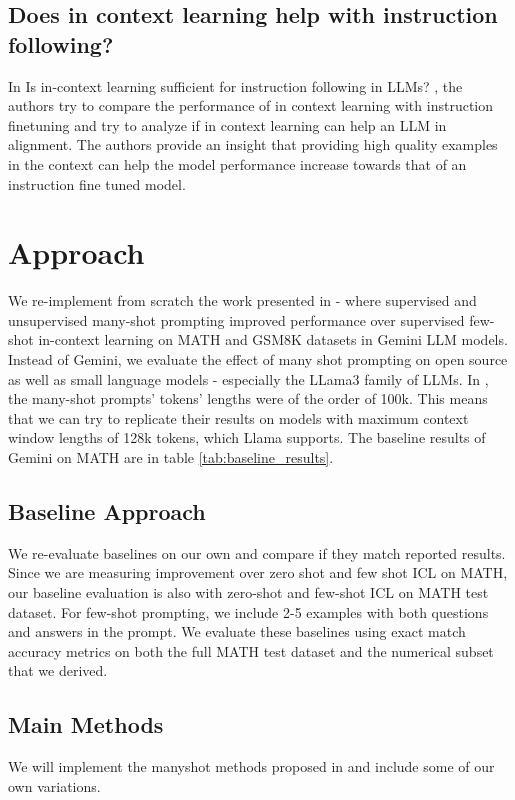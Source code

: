 \documentclass[twocolumn,11pt]{article}
\begin{document}
\subsection{Does in context learning help with instruction following?}
In Is in-context learning sufficient for instruction following in LLMs? \cite{zhao2024incontextlearningsufficientinstruction}, the authors try to compare the performance of in context learning with instruction finetuning and try to analyze if in context learning can help an LLM in alignment. The authors provide an insight that providing high quality examples in the context can help the model performance increase towards that of an instruction fine tuned model.

\section{Approach}
We re-implement from scratch the work presented in \cite{agarwal2024manyshotincontextlearning} - where supervised and unsupervised many-shot prompting improved performance over supervised few-shot in-context learning on MATH and GSM8K datasets in Gemini LLM models. Instead of Gemini, we evaluate the effect of many shot prompting on open source as well as small language models - especially the LLama3 family of LLMs. In \cite{agarwal2024manyshotincontextlearning}, the many-shot prompts' tokens' lengths were of the order of 100k. This means that we can try to replicate their results on models with maximum context window lengths of 128k tokens, which Llama supports. The baseline results of Gemini on MATH are in table \ref{tab:baseline_results}.

\subsection{Baseline Approach}
We re-evaluate baselines on our own and compare if they match reported results. Since we are measuring improvement over zero shot and few shot ICL on MATH, our baseline evaluation is also with zero-shot and few-shot ICL on MATH test dataset. For few-shot prompting, we include 2-5 examples with both questions and answers in the prompt. We evaluate these baselines using exact match accuracy metrics on both the full MATH test dataset and the numerical subset that we derived.

\subsection{Main Methods}
We will implement the manyshot methods proposed in \cite{agarwal2024manyshotincontextlearning} and include some of our own variations.
\end{document}
